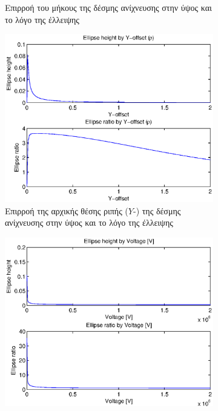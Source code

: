 \begin{figure}[tph]
\begin{subfigure}{0.47\textwidth}
		\centering
		\caption{Επιρροή του μήκους της δέσμης ανίχνευσης στην ύψος και το λόγο της έλλειψης}
		\label{fig:beam-deflection-script-04-elipse-height-by-bunch-intensity}
	\end{subfigure}
	\par\bigskip
	\begin{subfigure}{0.47\textwidth}
		\includegraphics[width=\linewidth]{figures/beam-deflection-script-05-elipse-ratio-by-bunch-intensity}
		\centering
		\caption[Επιρροή της αρχικής θέσης ριπής της δέσμης ανίχνευσης στην ύψος και το λόγο της έλλειψης]{Επιρροή της αρχικής θέσης ριπής ($Y$-) της δέσμης ανίχνευσης στην ύψος και το λόγο της έλλειψης}
		\label{fig:beam-deflection-script-05-elipse-ratio-by-bunch-intensity}
	\end{subfigure}
	\hfill
	\begin{subfigure}{0.47\textwidth}
		\includegraphics[width=\linewidth]{figures/beam-deflection-script-06}

\end{subfigure}
\end{figure}

